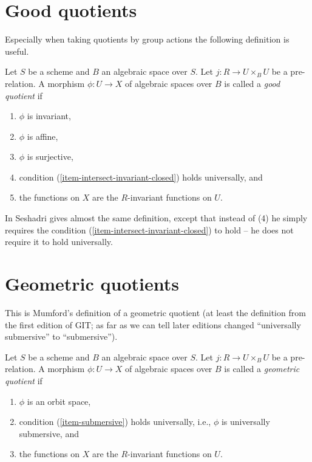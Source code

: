 \section{Good quotients}
\label{section-good}

\noindent
Especially when taking quotients by group actions the following definition
is useful. 

\begin{definition}
\label{definition-good}
Let $S$ be a scheme and $B$ an algebraic space over $S$.
Let $j : R \to U \times_B U$ be a pre-relation.
A morphism $\phi : U \to X$ of algebraic spaces over $B$
is called a {\it good quotient} if
\begin{enumerate}
\item $\phi$ is invariant,
\item $\phi$ is affine,
\item $\phi$ is surjective,
\item condition (\ref{item-intersect-invariant-closed}) holds universally, and
\item the functions on $X$ are the $R$-invariant functions on $U$.
\end{enumerate}
\end{definition}

\noindent
In \cite{seshadri_quotients} Seshadri gives almost the same definition,
except that instead of (4) he simply requires the condition
(\ref{item-intersect-invariant-closed}) to hold -- he does not require
it to hold universally.







\section{Geometric quotients}
\label{section-geometric}

\noindent
This is Mumford's definition of a geometric quotient (at least the definition
from the first edition of GIT; as far as we can tell later editions
changed ``universally submersive'' to ``submersive'').

\begin{definition}
\label{definition-geometric}
Let $S$ be a scheme and $B$ an algebraic space over $S$.
Let $j : R \to U \times_B U$ be a pre-relation.
A morphism $\phi : U \to X$ of algebraic spaces over $B$
is called a {\it geometric quotient} if
\begin{enumerate}
\item $\phi$ is an orbit space,
\item condition (\ref{item-submersive}) holds universally, i.e.,
$\phi$ is universally submersive, and
\item the functions on $X$ are the $R$-invariant functions on $U$.
\end{enumerate}
\end{definition}
















